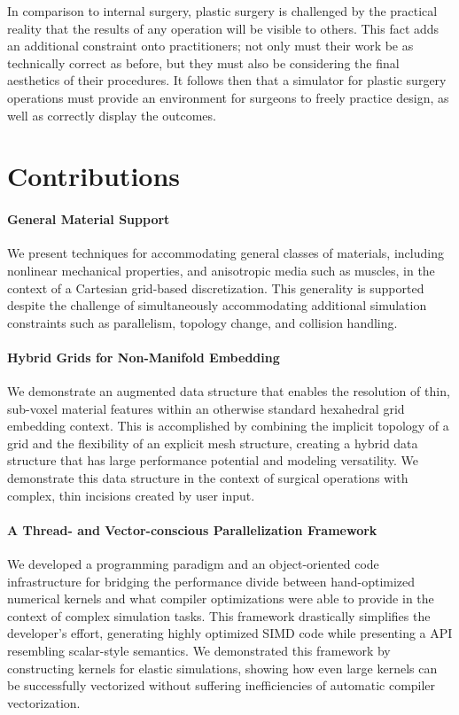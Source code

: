 In comparison to internal surgery, plastic surgery is challenged by the
practical reality that the results of any operation will be visible to
others. This fact adds an additional constraint onto practitioners;
not only must their work be as technically correct as before, but they
must also be considering the final aesthetics of their procedures. It
follows then that a simulator for plastic surgery operations must
provide an environment for surgeons to freely practice design, as well
as correctly display the outcomes.

\section{Contributions}

\paragraph{General Material Support} We present techniques for
accommodating general classes of materials, including nonlinear
mechanical properties, and anisotropic media such as muscles, in the
context of a Cartesian grid-based discretization. This generality is
supported despite the challenge of simultaneously accommodating
additional simulation constraints such as parallelism, topology
change, and collision handling.

\paragraph{Hybrid Grids for Non-Manifold Embedding} We demonstrate an
augmented data structure that enables the resolution of thin,
sub-voxel material features within an otherwise standard hexahedral
grid embedding context. This is accomplished by combining the implicit
topology of a grid and the flexibility of an explicit mesh structure,
creating a hybrid data structure that has large performance potential
and modeling versatility. We demonstrate this data structure in the
context of surgical operations with complex, thin incisions created by
user input.

\paragraph{A Thread- and Vector-conscious Parallelization Framework}
We developed a programming paradigm and an object-oriented code
infrastructure for bridging the performance divide between
hand-optimized numerical kernels and what compiler optimizations were
able to provide in the context of complex simulation tasks. This
framework drastically simplifies the developer's effort, generating
highly optimized SIMD code while presenting a API resembling
scalar-style semantics. We demonstrated this framework by constructing
kernels for elastic simulations, showing how even large kernels can be
successfully vectorized without suffering inefficiencies of automatic
compiler vectorization.

